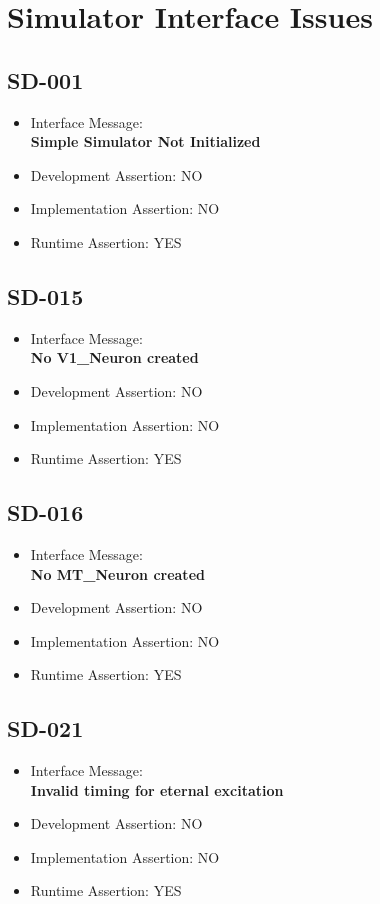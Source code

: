\section{Simulator Interface Issues}

\subsection{SD-001}
\begin{itemize}
  \item Interface Message:\\[1em]
    \textbf{Simple Simulator Not Initialized}
  \item Development Assertion: NO
  \item Implementation Assertion: NO
  \item Runtime Assertion: YES
\end{itemize}

\subsection{SD-015}
\begin{itemize}
  \item Interface Message:\\[1em]
    \textbf{No V1\_Neuron created}
  \item Development Assertion: NO
  \item Implementation Assertion: NO
  \item Runtime Assertion: YES
\end{itemize}

\subsection{SD-016}
\begin{itemize}
  \item Interface Message:\\[1em]
    \textbf{No MT\_Neuron created}
  \item Development Assertion: NO
  \item Implementation Assertion: NO
  \item Runtime Assertion: YES
\end{itemize}

\subsection{SD-021}
\begin{itemize}
  \item Interface Message:\\[1em]
    \textbf{Invalid timing for eternal excitation}
  \item Development Assertion: NO
  \item Implementation Assertion: NO
  \item Runtime Assertion: YES
\end{itemize}

